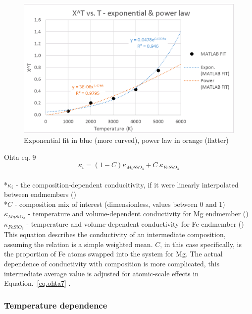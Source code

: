 \begin{figure}[h]
  \includegraphics[width=\linewidth]{Figures/draft_XTT.png}
  \caption{Exponential fit in blue (more curved), power law in orange (flatter)}
  \label{fig:draft_xtt}
\end{figure}



Ohta eq. 9 
\begin{equation}%
\kappa_{i}=\left ( 1-C \right )\kappa_{MgSiO_{3}}+C\ \kappa_{FeSiO_{3}}
\label{eq.ohta9}
\end{equation}%
\\ *$\kappa_{i}$ - the composition-dependent conducitivity, if it were linearly interpolated between endmembers (\wmk)\\
*$C$ - composition mix of interest (dimensionless, values between 0 and 1)\\
$\kappa_{MgSiO_{3}}$ - temperature and volume-dependent conductivity for Mg endmember (\wmk)\\
$\kappa_{FeSiO_{3}}$ - temperature and volume-dependent conductivity for Fe endmember (\wmk)\\

This equation describes the conductivity of an intermediate composition, assuming the relation is a simple weighted mean. $C$, in this case specifically, is the proportion of Fe atoms swapped into the system for Mg. The actual dependence of conductivity with composition is more complicated, this intermediate average value is adjusted for atomic-scale effects in Equation.~\ref{eq.ohta7} \citep[][Eq. 7]{Ohta2017}. \\

\subsubsection{Temperature dependence}

